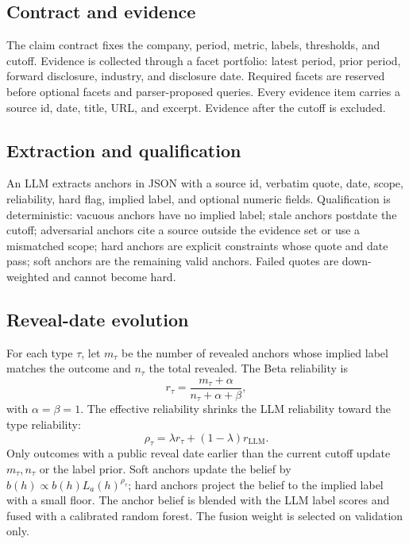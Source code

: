 \documentclass[11pt]{article}
\begin{document}
\subsection{Contract and evidence}
The claim contract fixes the company, period, metric, labels, thresholds, and cutoff. Evidence is collected through a facet portfolio: latest period, prior period, forward disclosure, industry, and disclosure date. Required facets are reserved before optional facets and parser-proposed queries. Every evidence item carries a source id, date, title, URL, and excerpt. Evidence after the cutoff is excluded.

\subsection{Extraction and qualification}
An LLM extracts anchors in JSON with a source id, verbatim quote, date, scope, reliability, hard flag, implied label, and optional numeric fields. Qualification is deterministic: vacuous anchors have no implied label; stale anchors postdate the cutoff; adversarial anchors cite a source outside the evidence set or use a mismatched scope; hard anchors are explicit constraints whose quote and date pass; soft anchors are the remaining valid anchors. Failed quotes are down-weighted and cannot become hard.

\subsection{Reveal-date evolution}
For each type $\tau$, let $m_\tau$ be the number of revealed anchors whose implied label matches the outcome and $n_\tau$ the total revealed. The Beta reliability is
\begin{equation}
r_\tau=\frac{m_\tau+\alpha}{n_\tau+\alpha+\beta},
\end{equation}
with $\alpha=\beta=1$. The effective reliability shrinks the LLM reliability toward the type reliability:
\begin{equation}
\rho_\tau=\lambda r_\tau+(1-\lambda)r_{\mathrm{LLM}}.
\end{equation}
Only outcomes with a public reveal date earlier than the current cutoff update $m_\tau,n_\tau$ or the label prior. Soft anchors update the belief by $b(h)\propto b(h)L_a(h)^{\rho_\tau}$; hard anchors project the belief to the implied label with a small floor. The anchor belief is blended with the LLM label scores and fused with a calibrated random forest. The fusion weight is selected on validation only.
\end{document}

